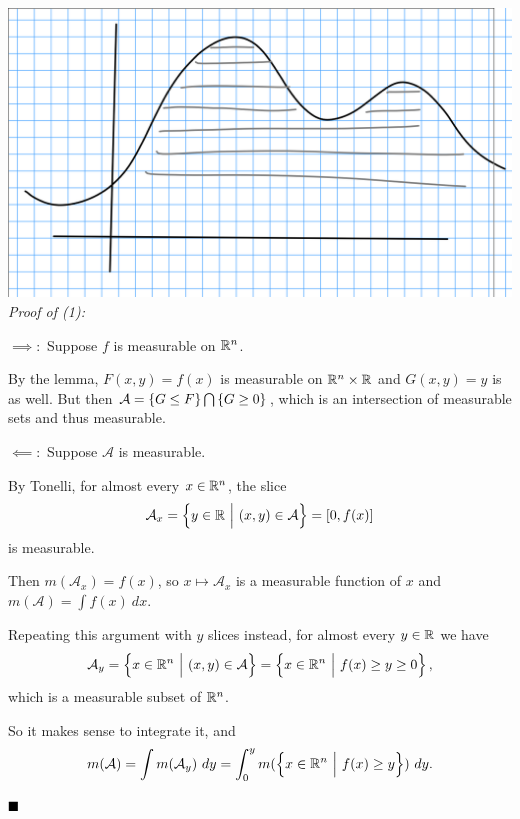 \includegraphics{figures/2019-10-08-11:33.png}\\

\emph{Proof of (1):}

\(\implies:\) Suppose \(f\) is measurable on \({\mathbb{R}}^n\).

By the lemma, \(F(x, y) = f(x)\) is measurable on \({\mathbb{R}}^n \times {\mathbb{R}}\)
and \(G(x, y) = y\) is as well. But then
\(\mathcal{A} = \left\{{G \leq F}\right\} \bigcap \left\{{G \geq 0}\right\}\), which
is an intersection of measurable sets and thus measurable.

\(\impliedby:\) Suppose \(\mathcal{A}\) is measurable.

By Tonelli, for almost every \(x\in {\mathbb{R}}^n\), the slice
\begin{align*}
\mathcal{A}_x = \left\{{y \in {\mathbb{R}} {~\mathrel{\Big|}~} (x, y) \in \mathcal{A}}\right\} = [0, f(x)]
\end{align*} is measurable.

Then \(m(\mathcal{A}_x) = f(x)\), so \(x\mapsto \mathcal{A}_x\) is a
measurable function of \(x\) and \(m(\mathcal{A}) = \int f(x) ~dx\).

Repeating this argument with \(y\) slices instead, for almost every
\(y\in {\mathbb{R}}\) we have
\begin{align*}
\mathcal{A}_y = \left\{{x \in {\mathbb{R}}^n {~\mathrel{\Big|}~} (x, y) \in \mathcal{A}}\right\} = \left\{{x\in{\mathbb{R}}^n {~\mathrel{\Big|}~} f(x) \geq y \geq 0}\right\}
,\end{align*} which is a measurable subset of \({\mathbb{R}}^n\).

So it makes sense to integrate it, and
\begin{align*}
m(\mathcal{A}) 
= \int m(\mathcal{A}_y)~dy 
= \int_0^y m(\left\{{x \in {\mathbb{R}}^n {~\mathrel{\Big|}~} f(x) \geq y}\right\}) ~dy
.\end{align*}

\(\qed\)

